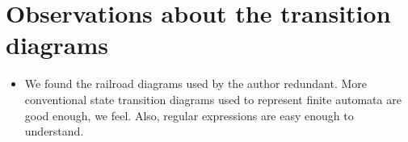 \documentclass[11pt,a4paper]{article}
\begin{document}
\section{Observations about the transition diagrams}
\begin{itemize}
    \item We found the railroad diagrams used by the author redundant. More conventional state transition diagrams used to represent finite automata are good enough, we feel. Also, regular expressions are easy enough to understand.
\end{itemize}
\end{document}
